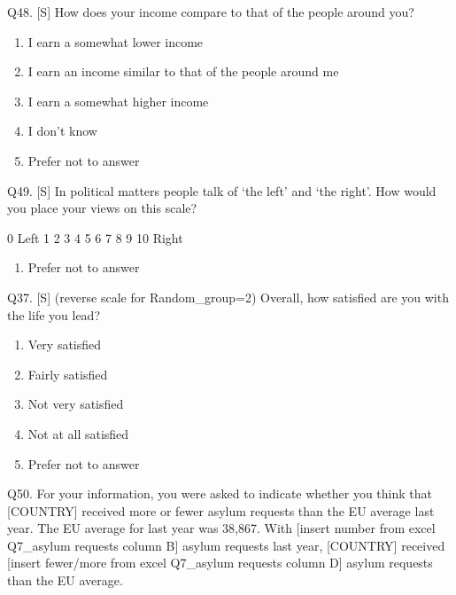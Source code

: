 \documentclass[
  12pt,
  a4paper,
]{article}
\providecommand{\tightlist}{%
  \setlength{\itemsep}{0pt}\setlength{\parskip}{0pt}}
\begin{document}
Q48. {[}S{]} How does your income compare to that of the people around you?

\begin{enumerate}
\def\labelenumi{\arabic{enumi}.}
\tightlist
\item
  I earn a somewhat lower income
\item
  I earn an income similar to that of the people around me
\item
  I earn a somewhat higher income
\item
  I don't know
\item
  Prefer not to answer
\end{enumerate}

Q49. {[}S{]} In political matters people talk of `the left' and `the right'. How would you place your views on this scale?

0
Left 1 2 3 4 5 6 7 8 9 10
Right

\begin{enumerate}
\def\labelenumi{\arabic{enumi}.}
\setcounter{enumi}{98}
\tightlist
\item
  Prefer not to answer
\end{enumerate}

Q37. {[}S{]} (reverse scale for Random\_group=2) Overall, how satisfied are you with the life you lead?

\begin{enumerate}
\def\labelenumi{\arabic{enumi}.}
\tightlist
\item
  Very satisfied
\item
  Fairly satisfied
\item
  Not very satisfied
\item
  Not at all satisfied
\item
  Prefer not to answer
\end{enumerate}

Q50. For your information, you were asked to indicate whether you think that {[}COUNTRY{]} received more or fewer asylum requests than the EU average last year. The EU average for last year was 38,867. With {[}insert number from excel Q7\_asylum requests column B{]} asylum requests last year, {[}COUNTRY{]} received {[}insert fewer/more from excel Q7\_asylum requests column D{]} asylum requests than the EU average.
\end{document}

